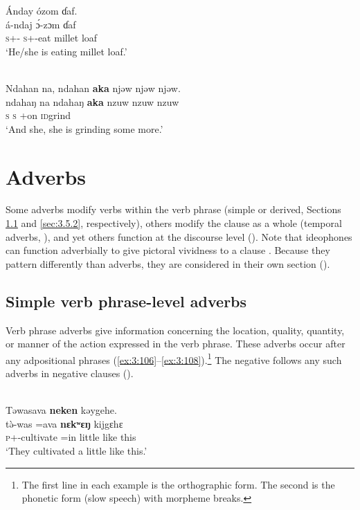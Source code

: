 \ea \label{ex:3:104}
Ánday  ózom  ɗaf.\\
\gll  á-ndaj    \'{ɔ}-zɔm     ɗaf\\
      \textsc{s}+{\IFV}-{\PROG}  \textsc{s}+{\IFV}-eat  {millet loaf}\\
\glt  ‘He/she is eating millet loaf.’
\z

\ea \label{ex:3:105}\\
Ndahan  na,  ndahan    \textbf{aka}  njəw  njəw  njəw.\\
\gll ndahaŋ   na    ndahaŋ   \textbf{aka}          {nzuw  nzuw  nzuw}\\
      \textsc{s}                   {\PSP}    \textsc{s}           {\EXT}+on       \textsc{id}grind\\
\glt  ‘And she, she is grinding some more.'
\z

\section{Adverbs}\label{sec:3.5}
\hypertarget{RefHeading1211141525720847}{}
\largerpage Some adverbs modify verbs within the verb phrase (simple or derived, Sections \ref{sec:3.5.1} and \ref{sec:3.5.2}, respectively), others modify the clause as a whole (temporal adverbs, ), and yet others function at the discourse level (). Note that ideophones can function adverbially to give pictoral vividness to a clause \citep{Doke1935}. Because they pattern differently than adverbs, they are considered in their own section ().

\subsection{Simple verb phrase-level adverbs}\label{sec:3.5.1}
\hypertarget{RefHeading1211161525720847}{}
Verb phrase adverbs give information concerning the location, quality, quantity, or manner of the action expressed in the verb phrase. These adverbs occur after any adpositional phrases (\ref{ex:3:106}--\ref{ex:3:108}).\footnote{The first line in each example is the orthographic form. The second is the phonetic form (slow speech) with morpheme breaks.} The negative follows any such adverbs in negative clauses (). 


\ea \label{ex:3:106}
\\
Təwasava  \textbf{neken} kəygehe.\\
\gll t\`{ə}-was                  =ava         \textbf{nɛkʷɛŋ}  kijgɛhɛ\\
      \textsc{p}+{\PFV}-cultivate =in       little    {like this}\\
\glt  ‘They cultivated a little like this.’
\z

